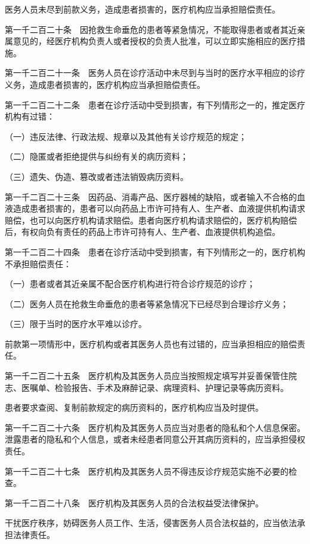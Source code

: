 \documentclass[UTF8,12pt,a4paper]{ctexbook}
\begin{document}
医务人员未尽到前款义务，造成患者损害的，医疗机构应当承担赔偿责任。

第一千二百二十条　因抢救生命垂危的患者等紧急情况，不能取得患者或者其近亲属意见的，经医疗机构负责人或者授权的负责人批准，可以立即实施相应的医疗措施。

第一千二百二十一条　医务人员在诊疗活动中未尽到与当时的医疗水平相应的诊疗义务，造成患者损害的，医疗机构应当承担赔偿责任。

第一千二百二十二条　患者在诊疗活动中受到损害，有下列情形之一的，推定医疗机构有过错：

（一）违反法律、行政法规、规章以及其他有关诊疗规范的规定；

（二）隐匿或者拒绝提供与纠纷有关的病历资料；

（三）遗失、伪造、篡改或者违法销毁病历资料。

第一千二百二十三条　因药品、消毒产品、医疗器械的缺陷，或者输入不合格的血液造成患者损害的，患者可以向药品上市许可持有人、生产者、血液提供机构请求赔偿，也可以向医疗机构请求赔偿。患者向医疗机构请求赔偿的，医疗机构赔偿后，有权向负有责任的药品上市许可持有人、生产者、血液提供机构追偿。

第一千二百二十四条　患者在诊疗活动中受到损害，有下列情形之一的，医疗机构不承担赔偿责任：

（一）患者或者其近亲属不配合医疗机构进行符合诊疗规范的诊疗；

（二）医务人员在抢救生命垂危的患者等紧急情况下已经尽到合理诊疗义务；

（三）限于当时的医疗水平难以诊疗。

前款第一项情形中，医疗机构或者其医务人员也有过错的，应当承担相应的赔偿责任。

第一千二百二十五条　医疗机构及其医务人员应当按照规定填写并妥善保管住院志、医嘱单、检验报告、手术及麻醉记录、病理资料、护理记录等病历资料。

患者要求查阅、复制前款规定的病历资料的，医疗机构应当及时提供。

第一千二百二十六条　医疗机构及其医务人员应当对患者的隐私和个人信息保密。泄露患者的隐私和个人信息，或者未经患者同意公开其病历资料的，应当承担侵权责任。

第一千二百二十七条　医疗机构及其医务人员不得违反诊疗规范实施不必要的检查。

第一千二百二十八条　医疗机构及其医务人员的合法权益受法律保护。

干扰医疗秩序，妨碍医务人员工作、生活，侵害医务人员合法权益的，应当依法承担法律责任。

\end{document}
